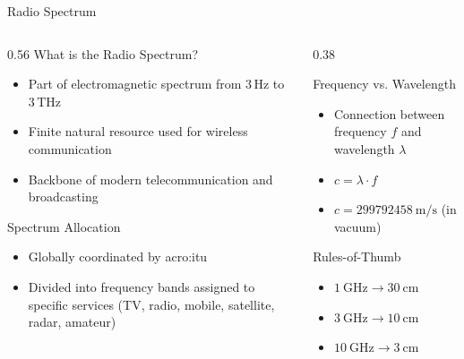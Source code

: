 
\begin{frame}{Radio Spectrum}
  \begin{columns}[T,onlytextwidth]
    \begin{column}{0.56\textwidth}
      What is the Radio Spectrum?
      \begin{itemize}
        \item Part of electromagnetic spectrum from $3\,\mathrm{Hz}$ to $3\,\mathrm{THz}$
        \item Finite natural resource used for wireless communication
        \item Backbone of modern telecommunication and broadcasting
      \end{itemize}
      \vspace{0.3em}
      Spectrum Allocation
      \begin{itemize}
        \item Globally coordinated by \gls{acro:itu}
        \item Divided into frequency bands assigned to specific services (TV, radio, mobile, satellite, radar, amateur)
      \end{itemize}
    \end{column}
    \begin{column}{0.38\textwidth}
      \begin{block}{Frequency vs. Wavelength}
       \begin{itemize}
         \item Connection between frequency $f$ and wavelength $\lambda$
         \item $c = \lambda \cdot f$
         \item $c = \qty{299792458}{\meter\per\second}$ (in vacuum)
       \end{itemize}
      \end{block}
      \begin{alertblock}{Rules-of-Thumb}
        \begin{itemize}
          \item $\qty{1}{\giga\hertz} \rightarrow \qty{30}{\centi\meter}$
          \item $\qty{3}{\giga\hertz} \rightarrow \qty{10}{\centi\meter}$
          \item $\qty{10}{\giga\hertz} \rightarrow \qty{3}{\centi\meter}$
        \end{itemize}
      \end{alertblock}
    \end{column}
  \end{columns}
\end{frame}

